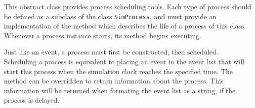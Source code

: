 
This abstract class provides process scheduling tools.
Each type of process should be defined as a subclass of the
class \texttt{SimProcess}, and must provide an implementation of the method
 which describes the life of a process of this class.
Whenever a process instance starts, its  method
begins executing.

Just like an event, a process must first be constructed, then scheduled.
Scheduling a process is equivalent to placing an event in the event list
that will start this process when
the simulation clock reaches the specified time.
The  method can be overridden to return
information about the process.  This information will
be returned when formating the event list as a string, if the
process is delayed.


